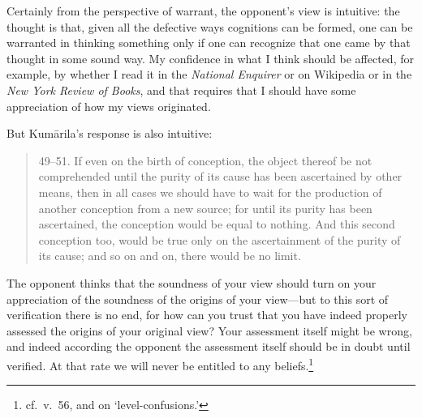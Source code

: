 \documentclass[11pt,letterpaper,oneside]{amsart}
\newenvironment{squote}{\begin{quote}\sf\small}{\rm\end{quote}} %
\begin{document}
Certainly from the perspective of warrant, the opponent's view is intuitive: the thought is that, given all the defective ways cognitions can be formed, one can be warranted in thinking something only if one can recognize that one came by that thought in some sound way. My confidence in what I think should be affected, for example, by whether I read it in the \emph{National Enquirer} or on Wikipedia or in the \emph{New York Review of Books}, and that requires that I should have some appreciation of how my views originated.

But Kum\=arila's response is also intuitive:\begin{squote}49--51. If even on the birth of conception, the object thereof be not comprehended until the purity of its cause has been ascertained by other means, then in all cases we should have to wait for the production of another conception from a new source; for until its purity has been ascertained, the conception would be equal to nothing. And this second conception too, would be true only on the ascertainment of the purity of its cause; and so on and on, there would be no limit.\end{squote} The opponent thinks that the soundness of your view should turn on your appreciation of the soundness of the origins of your view---but to this sort of verification there is no end, for how can you trust that you have indeed properly assessed the origins of your original view? Your assessment itself might be wrong, and indeed according the opponent the assessment itself should be in doubt until verified. At that rate we will never be entitled to any beliefs.\footnote{cf.\ v.\ 56, and \citet{alston1980level} on `level-confusions.'}
\end{document}
